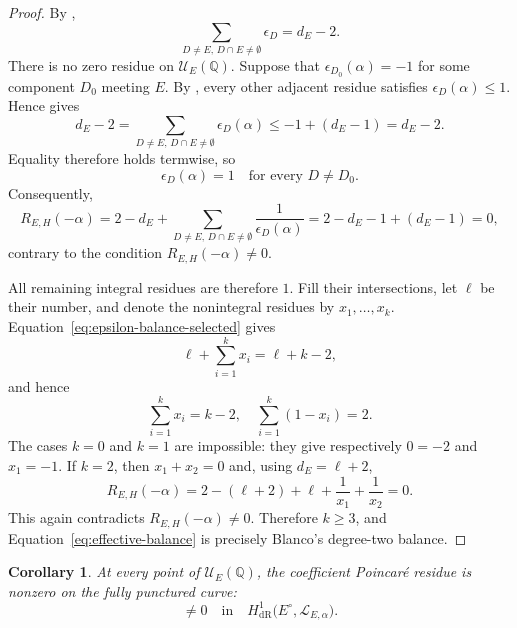 \documentclass[12pt]{amsart}
\numberwithin{equation}{section}
\theoremstyle{plain}
\newtheorem{corollary}[theorem]{Corollary}
\theoremstyle{definition}
\theoremstyle{remark}
\theoremstyle{definition}
\newcommand{\Q}{\mathbb Q}
\newcommand{\Lcal}{\mathscr L}
\begin{document}
\begin{proof}
By ,
\begin{equation}\label{eq:epsilon-balance-selected}
 \sum_{D\neq E,\, D\cap E\neq \emptyset}\epsilon_D=d_E-2.
\end{equation}
There is no zero residue on $\mathcal U_E(\Q)$. Suppose that $\epsilon_{D_0}(\alpha)=-1$ for some component $D_0$ meeting $E$. By , every other adjacent residue satisfies $\epsilon_D(\alpha)\leq1$. Hence  gives
\begin{equation*}
d_E-2
   =\sum_{D\neq E,\, D\cap E\neq \emptyset}\epsilon_D(\alpha)
   \leq -1+(d_E-1)
   =d_E-2.
\end{equation*}
Equality therefore holds termwise, so
\begin{equation*}
\epsilon_D(\alpha)=1
  \quad\text{for every }D\neq D_0.
\end{equation*}
Consequently,
\begin{equation*}
R_{E,H}(-\alpha)
   =2-d_E+\sum_{D\neq E,\, D\cap E\neq \emptyset}\frac{1}{\epsilon_D(\alpha)}=2-d_E-1+(d_E-1)=0,
\end{equation*}
contrary to the condition $R_{E,H}(-\alpha)\neq0$. 

All remaining integral residues are therefore $1$. Fill their intersections, let $\ell$ be their number, and denote the nonintegral residues by $x_1,\ldots,x_k$. Equation~\eqref{eq:epsilon-balance-selected} gives
\begin{equation*}
\ell+\sum_{i=1}^k x_i=\ell+k-2,
\end{equation*}
and hence
\begin{equation}\label{eq:effective-balance}
 \sum_{i=1}^k x_i=k-2,
 \quad
 \sum_{i=1}^k(1-x_i)=2.
\end{equation}
The cases $k=0$ and $k=1$ are impossible: they give respectively $0=-2$ and $x_1=-1$. If $k=2$, then $x_1+x_2=0$ and, using $d_E=\ell+2$,
\begin{equation*}
R_{E,H}(-\alpha)
 =
 2-(\ell+2)+\ell+\frac1{x_1}+\frac1{x_2}=0.
\end{equation*}
This again contradicts $R_{E,H}(-\alpha)\neq0$. Therefore $k\geq3$, and Equation~\eqref{eq:effective-balance} is precisely Blanco's degree-two balance.
\end{proof}

\begin{corollary}\label{cor:selected-blanco-class}
At every point of $\mathcal U_E(\Q)$, the coefficient Poincar\'e residue is nonzero on the fully punctured curve:
\begin{equation*}
[R_{E,\alpha}]
 \neq0
 \quad\text{in}\quad
 H^1_{\mathrm{dR}}
 \bigl(E^\circ,\Lcal_{E,\alpha}\bigr).
\end{equation*}
\end{corollary}
\end{document}
